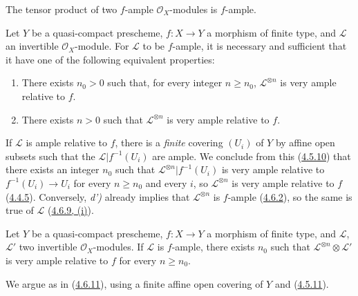 \begin{corollary}[4.6.10]
\label{II.4.6.10}
The tensor product of two $f$-ample $\mathcal{O}_X$-modules is
$f$-ample.
\end{corollary}

\begin{proposition}[4.6.11]
\label{II.4.6.11}
Let $Y$ be a quasi-compact prescheme, $f:X\to Y$ a morphism of finite
type, and $\mathcal{L}$ an invertible $\mathcal{O}_X$-module. For
$\mathcal{L}$ to be $f$-ample, it is necessary and sufficient that it have one of the
following equivalent properties:
\begin{enumerate}
  \item[\rm{d)}] There exists $n_0>0$ such that, for every integer $n\geq n_0$,
  $\mathcal{L}^{\otimes n}$ is very ample relative to $f$.
  \item[\rm{d')}] There exists $n>0$ such that $\mathcal{L}^{\otimes n}$ is
  very ample relative to $f$.
\end{enumerate}
\end{proposition}

If $\mathcal{L}$ is ample relative to $f$, there is a \emph{finite} covering
$(U_i)$ of $Y$ by affine open subsets such that the
$\mathcal{L}|f^{-1}(U_i)$ are ample. We conclude from this
(\hyperref[II.4.5.10]{4.5.10}) that there exists an integer $n_0$ such that
$\mathcal{L}^{\otimes n}|f^{-1}(U_i)$ is very ample relative to
$f^{-1}(U_i)\to U_i$ for every $n\geq n_0$ and every $i$, so
$\mathcal{L}^{\otimes n}$ is very ample relative to $f$
(\hyperref[II.4.4.5]{4.4.5}). Conversely, \emph{d')} already implies that
$\mathcal{L}^{\otimes n}$ is $f$-ample
(\hyperref[II.4.6.2]{4.6.2}), so the same is true of $\mathcal{L}$
(\hyperref[II.4.6.9]{4.6.9, (i)}).

\begin{corollary}[4.6.12]
\label{II.4.6.12}
Let $Y$ be a quasi-compact prescheme, $f:X\to Y$ a morphism of finite
type, and $\mathcal{L}$, $\mathcal{L}'$ two invertible
$\mathcal{O}_X$-modules. If $\mathcal{L}$ is $f$-ample, there exists $n_0$ such that
$\mathcal{L}^{\otimes n}\otimes\mathcal{L}'$ is very ample relative
to $f$ for every $n\geq n_0$.
\end{corollary}

We argue as in (\hyperref[II.4.6.11]{4.6.11}), using a finite
affine open covering of $Y$ and
(\hyperref[II.4.5.11]{4.5.11}).

